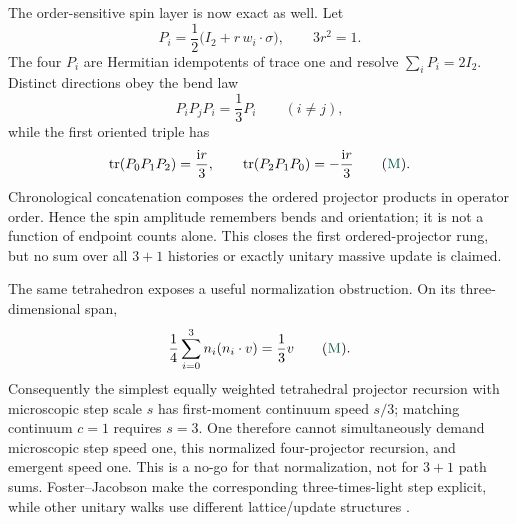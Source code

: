 \documentclass[11pt]{article}
\newcommand{\Mtag}{\textcolor{verified}{\textsc{M}}}
\newcommand{\ii}{\mathrm{i}}
\newcommand{\tr}{\operatorname{tr}}
\begin{document}
The order-sensitive spin layer is now exact as well.  Let
\begin{equation}\label{eq:tetprojector}
 P_i=\frac12\bigl(I_2+r\,w_i\mathbin{\cdot}\sigma\bigr),
 \qquad 3r^2=1.
\end{equation}
The four $P_i$ are Hermitian idempotents of trace one and resolve
$\sum_iP_i=2I_2$.  Distinct directions obey the bend law
\begin{equation}\label{eq:tetbend}
 P_iP_jP_i=\frac13P_i\qquad(i\ne j),
\end{equation}
while the first oriented triple has
\begin{equation}\label{eq:tetphase}
 \tr(P_0P_1P_2)=\frac{\ii r}{3},
 \qquad
 \tr(P_2P_1P_0)=-\frac{\ii r}{3}
 \qquad(\Mtag).
\end{equation}
Chronological concatenation composes the ordered projector products in operator
order.  Hence the spin amplitude remembers bends and orientation; it is not a
function of endpoint counts alone.  This closes the first ordered-projector
rung, but no sum over all $3+1$ histories or exactly unitary massive update is
claimed.

The same tetrahedron exposes a useful normalization obstruction.  On its
three-dimensional span,
\begin{equation}\label{eq:tettightframe}
 \frac14\sum_{i=0}^3 n_i(n_i\mathbin{\cdot}v)=\frac13v
 \qquad(\Mtag).
\end{equation}
Consequently the simplest equally weighted tetrahedral projector recursion
with microscopic step scale $s$ has first-moment continuum speed $s/3$;
matching continuum $c=1$ requires $s=3$.  One therefore cannot simultaneously
demand microscopic step speed one, this normalized four-projector recursion,
and emergent speed one.  This is a no-go for that normalization, not for
$3+1$ path sums.  Foster--Jacobson make the corresponding three-times-light
step explicit, while other unitary walks use different lattice/update
structures \cite{FosterJacobson,DarianoWeyl,NzonganiTetra}.
\end{document}
